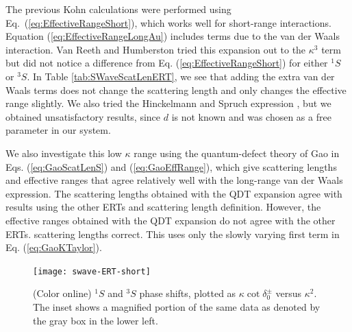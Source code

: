 \documentclass[preprint,showpacs,showkeys,preprintnumbers,amsmath,amssymb,longbibliography,pra,aps]{revtex4-1}
\begin{document}
The previous Kohn calculations \cite{VanReeth2003} were performed using
Eq.~(\ref{eq:EffectiveRangeShort}), which works well for short-range
interactions. Equation (\ref{eq:EffectiveRangeLongAu}) includes terms due
to the van der Waals interaction. Van Reeth and Humberston \cite{VanReeth2003}
tried this expansion out to the $\kappa^3$ term but did not notice a
difference from Eq. (\ref{eq:EffectiveRangeShort}) for either $^1S$ or $^3S$.
In Table \ref{tab:SWaveScatLenERT}, we see that adding the extra van der
Waals terms does not change the scattering length and only changes the
effective range slightly. We also tried the Hinckelmann and Spruch
expression \cite{Hinckelmann1971}, but we obtained unsatisfactory results,
since $d$ is not known and was chosen as a free parameter in our system.

We also investigate this low $\kappa$ range using the quantum-defect theory 
of Gao \cite{Gao1998} in Eqs. (\ref{eq:GaoScatLenS}) and
(\ref{eq:GaoEffRange}), which give scattering lengths and effective ranges
that agree relatively 
well with the long-range van der Waals expression. The scattering lengths 
obtained with the QDT expansion agree with results using the other ERTs and 
scattering length definition. However, the effective ranges obtained with the 
QDT expansion do not agree with the other ERTs.
scattering lengths correct. This uses only the slowly varying first term in 
Eq. (\ref{eq:GaoKTaylor}). 

\begin{figure}[H]
	\centering
	\texttt{[image: swave-ERT-short]}
	\caption{(Color online) $^1S$ and $^3S$ phase shifts, plotted as
$\kappa \cot \delta_0^\pm$ versus $\kappa^2$. The inset shows a magnified
portion of the same data as denoted by the gray box in the lower left.}
	\label{fig:swave-ERT-short}
\end{figure}
\end{document}
